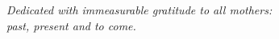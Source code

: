 \thispagestyle{empty}

\vspace*{1.75in}
{\center

\emph{Dedicated with immeasurable gratitude to all mothers:\\
past, present and to come.}

}

\cleardoublepage
